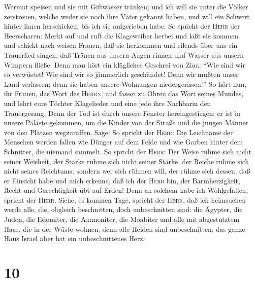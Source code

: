 Wermut speisen und sie mit Giftwasser tränken;  und ich
will sie unter die Völker zerstreuen, welche weder sie noch ihre Väter
gekannt haben, und will ein Schwert hinter ihnen herschicken, bis ich
sie aufgerieben habe.  So spricht der \textsc{Herr} der
Heerscharen: Merkt auf und ruft die Klageweiber herbei und laßt sie
kommen und schickt nach weisen Frauen,  daß sie herkommen
und eilends über uns ein Trauerlied singen, daß Tränen aus unsern Augen
rinnen und Wasser aus unsern Wimpern fließe.  Denn man
hört ein klägliches Geschrei von Zion: ``Wie sind wir so verwüstet! Wie
sind wir so jämmerlich geschändet! Denn wir mußten unser Land verlassen;
denn sie haben unsere Wohnungen niedergerissen!''  So
hört nun, ihr Frauen, das Wort des \textsc{Herrn}, und fasset zu Ohren
das Wort seines Mundes, und lehrt eure Töchter Klagelieder und eine jede
ihre Nachbarin den Trauergesang.  Denn der Tod ist durch
unsere Fenster hereingestiegen; er ist in unsere Paläste gekommen, um
die Kinder von der Straße und die jungen Männer von den Plätzen
wegzuraffen.  Sage: So spricht der \textsc{Herr}: Die
Leichname der Menschen werden fallen wie Dünger auf dem Felde und wie
Garben hinter dem Schnitter, die niemand sammelt.  So
spricht der \textsc{Herr}: Der Weise rühme sich nicht seiner Weisheit,
der Starke rühme sich nicht seiner Stärke, der Reiche rühme sich nicht
seines Reichtums;  sondern wer sich rühmen will, der
rühme sich dessen, daß er Einsicht habe und mich erkenne, daß ich der
\textsc{Herr} bin, der Barmherzigkeit, Recht und Gerechtigkeit übt auf
Erden! Denn an solchem habe ich Wohlgefallen, spricht der \textsc{Herr}.
 Siehe, es kommen Tage, spricht der \textsc{Herr}, daß
ich heimsuchen werde alle, die, obgleich beschnitten, doch unbeschnitten
sind:  die Ägypter, die Juden, die Edomiter, die
Ammoniter, die Moabiter und alle mit abgestutztem Haar, die in der Wüste
wohnen; denn alle Heiden sind unbeschnitten, das ganze Haus Israel aber
hat ein unbeschnittenes Herz.

\hypertarget{section-9}{%
\section{10}\label{section-9}}

